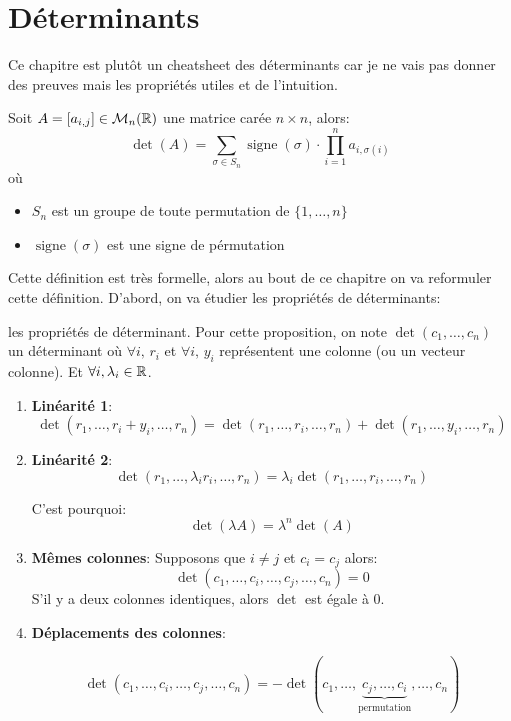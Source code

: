 \chapter{Déterminants}
Ce chapitre est plutôt un cheatsheet des déterminants car je ne vais pas donner des preuves mais les propriétés utiles et de l'intuition.

\begin{definition}
    Soit $A = [a_{i, j}] \in \mathcal{M}_{n}(\mathbb{R})$ une matrice carée $n \times n$, alors:
    \[
        \operatorname{det}(A) = \sum_{\sigma \in S_n}^{} \operatorname{signe}(\sigma) \cdot \prod_{i=1}^{n} a_{i, \sigma(i)} 
    \] 
    où 
    \begin{itemize}
        \item $S_n$ est un groupe de toute permutation de  $\{1, \ldots, n\}$
        \item $\operatorname{signe}(\sigma)$ est une signe de pérmutation
    \end{itemize}
\end{definition}

Cette définition est très formelle, alors au bout de ce chapitre on va reformuler cette définition. D'abord, on va étudier les propriétés de déterminants:

\begin{prop} les propriétés de déterminant.
    Pour cette proposition, on note $\det(c_1, \ldots, c_n)$ un déterminant où $\forall i, \, r_i$ et $\forall i, \, y_i$ représentent une colonne (ou un vecteur colonne). Et $\forall i, \lambda_i \in \mathbb{R}$.
    \begin{enumerate}
        \item \textbf{Linéarité 1}:
            \[
            \det(r_1, \ldots, r_i + y_i, \ldots, r_n) = \det(r_1, \ldots, r_i, \ldots, r_n) + \det(r_1, \ldots, y_i, \ldots, r_n)
            \] 
        \item \textbf{Linéarité 2}:
            \[
            \det(r_1, \ldots, \lambda_ir_i, \ldots, r_n) = \lambda_i\det(r_1, \ldots, r_i, \ldots, r_n) 
            \] 
            \begin{note}
               C'est pourquoi:
               \[
               \det(\lambda A) = \lambda^n\det(A)
               \] 
            \end{note}
        \item \textbf{Mêmes colonnes}: Supposons que $i \neq j$ et $c_i = c_j$ alors:
             \[
            \det(c_1, \ldots, c_i, \ldots, c_j, \ldots, c_n) = 0
            \] 
            S'il y a deux colonnes identiques, alors $\det$ est égale à 0.
        \item \textbf{Déplacements des colonnes}:
            
\[
    \det(c_1, \ldots, c_i, \ldots, c_j, \ldots, c_n) 
    = -\det(c_1, \ldots, 
    \underbrace{c_j , \ldots, 
    c_i}_{\text{permutation}}, \ldots, c_n)
\]

\end{enumerate}
\end{prop}
